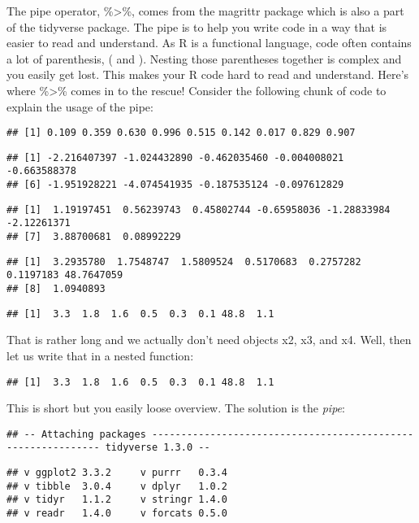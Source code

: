 \documentclass[
]{article}
\begin{document}
The pipe operator, \%\textgreater\%, comes from the magrittr package
which is also a part of the tidyverse package. The pipe is to help you
write code in a way that is easier to read and understand. As R is a
functional language, code often contains a lot of parenthesis, ( and ).
Nesting those parentheses together is complex and you easily get lost.
This makes your R code hard to read and understand. Here's where
\%\textgreater\% comes in to the rescue! Consider the following chunk of
code to explain the usage of the pipe:

\begin{verbatim}
## [1] 0.109 0.359 0.630 0.996 0.515 0.142 0.017 0.829 0.907
\end{verbatim}

\begin{verbatim}
## [1] -2.216407397 -1.024432890 -0.462035460 -0.004008021 -0.663588378
## [6] -1.951928221 -4.074541935 -0.187535124 -0.097612829
\end{verbatim}

\begin{verbatim}
## [1]  1.19197451  0.56239743  0.45802744 -0.65958036 -1.28833984 -2.12261371
## [7]  3.88700681  0.08992229
\end{verbatim}

\begin{verbatim}
## [1]  3.2935780  1.7548747  1.5809524  0.5170683  0.2757282  0.1197183 48.7647059
## [8]  1.0940893
\end{verbatim}

\begin{verbatim}
## [1]  3.3  1.8  1.6  0.5  0.3  0.1 48.8  1.1
\end{verbatim}

That is rather long and we actually don't need objects x2, x3, and x4.
Well, then let us write that in a nested function:

\begin{verbatim}
## [1]  3.3  1.8  1.6  0.5  0.3  0.1 48.8  1.1
\end{verbatim}

This is short but you easily loose overview. The solution is the
\emph{pipe}:

\begin{verbatim}
## -- Attaching packages ------------------------------------------------------------- tidyverse 1.3.0 --
\end{verbatim}

\begin{verbatim}
## v ggplot2 3.3.2     v purrr   0.3.4
## v tibble  3.0.4     v dplyr   1.0.2
## v tidyr   1.1.2     v stringr 1.4.0
## v readr   1.4.0     v forcats 0.5.0
\end{verbatim}
\end{document}

